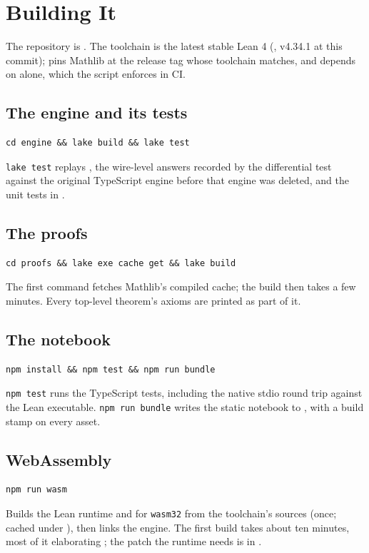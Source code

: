 \chapter{Building It}\label{app:build}

The repository is . The toolchain is the latest stable Lean 4
(, v4.34.1 at this commit);  pins Mathlib at the
release tag whose toolchain matches, and  depends on  alone, which the
script  enforces in CI.

\section*{The engine and its tests}
\begin{verbatim}
cd engine && lake build && lake test
\end{verbatim}
\texttt{lake test} replays , the wire-level answers recorded by the
differential test against the original TypeScript engine before that engine was deleted, and
the unit tests in .

\section*{The proofs}
\begin{verbatim}
cd proofs && lake exe cache get && lake build
\end{verbatim}
The first command fetches Mathlib's compiled cache; the build then takes a few minutes. Every
top-level theorem's axioms are printed as part of it.

\section*{The notebook}
\begin{verbatim}
npm install && npm test && npm run bundle
\end{verbatim}
\texttt{npm test} runs the TypeScript tests, including the native stdio round trip against the
Lean executable. \texttt{npm run bundle} writes the static notebook to
, with a build stamp on every asset.

\section*{WebAssembly}
\begin{verbatim}
npm run wasm
\end{verbatim}
Builds the Lean runtime and  for \texttt{wasm32} from the toolchain's sources (once;
cached under ), then links the engine. The first build takes about
ten minutes, most of it elaborating ; the patch the runtime needs is in
.

